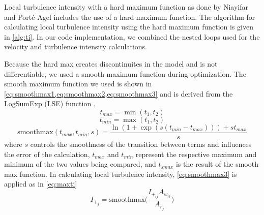 \documentclass[conf]{new-aiaa}
\begin{document}
Local turbulence intensity with a hard maximum function as done by Niayifar and Port\'{e}-Agel \cite{niayifar2016} includes the use of a hard maximum function. The algorithm for calculating local turbulence intensity using the hard maximum function is given in \cref{alg:ti}. In our code implementation, we combined the nested loops used for the velocity and turbulence intensity calculations. 

Because the hard max creates discontinuites in the model and is not differentiable, we used a smooth maximum function during optimization. The smooth maximum function we used is shown in \cref{eq:smoothmax1,eq:smoothmax2,eq:smoothmax3} and is derived from the LogSumExp (LSE) function \cite{cook}.
%
\begin{equation}\label{eq:smoothmax1}
    t_{max} = \min(t_1, t_2)
\end{equation}
\begin{equation}\label{eq:smoothmax2}
    t_{min} = \max(t_1, t_2)
\end{equation}
\begin{equation}\label{eq:smoothmax3}
   \text{smoothmax}(t_{max},t_{min},s) = \frac{\ln(1+\exp(s(t_{min}-t_{max})))+s t_{max}}{s}
\end{equation}
%
where $s$ controls the smoothness of the transition between terms and influences the error of the calculation, $t_{max}$ and $t_{min}$ represent the respective maximum and minimum of the two values being compared, and $t_{smax}$ is the result of the smooth max function. In calculating local turbulence intensity, \cref{eq:smoothmax3} is applied as in  \cref{eq:maxti}
%
\begin{equation}\label{eq:maxti}
    I_{+_j} = \text{smoothmax}{\bigg(\frac{I_{+_{ij}}A_{w_{ij}}}{A_{r_j}}\bigg)}
\end{equation}
%
\end{document}

